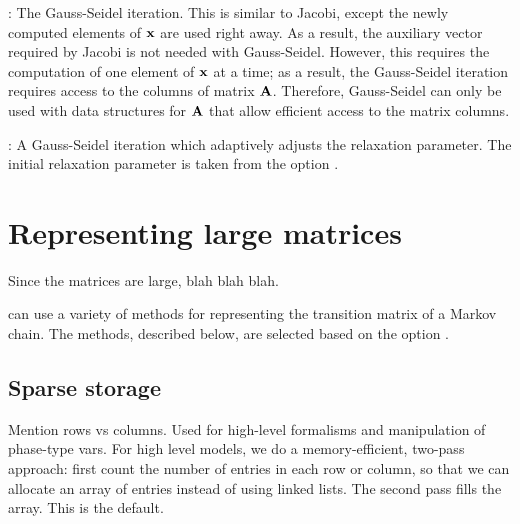 {\begin{description}
\item{ :}  The Gauss-Seidel iteration.
This is similar to Jacobi, except the newly computed elements of $\mathbf{x}$
are used right away.
As a result, the auxiliary vector required by Jacobi is not needed with
Gauss-Seidel.
However, this requires the computation of one element of $\mathbf{x}$ at a time;
as a result, the Gauss-Seidel iteration requires access to the columns of
matrix $\mathbf{A}$.
Therefore, Gauss-Seidel can only be used with data structures for $\mathbf{A}$
that allow efficient access to the matrix columns.



\item{ :} A Gauss-Seidel iteration which adaptively adjusts the
relaxation parameter.
\cite{1993IMA-SRNs}
The initial relaxation parameter is taken from the option
.


\end{description}

\section{Representing large matrices}
Since the matrices are large, blah blah blah.

{\smart} can use a variety of methods for representing the transition matrix of a Markov chain.
The methods, described below, are selected based on the option
.

\subsection{Sparse storage}
Mention rows vs columns.
Used for high-level formalisms and manipulation of phase-type vars.
For high level models, we do a memory-efficient, two-pass approach:
first count the number of entries in each row or column, so that we can
allocate an array of entries instead of using linked lists.
The second pass fills the array.
This is the default.

}

